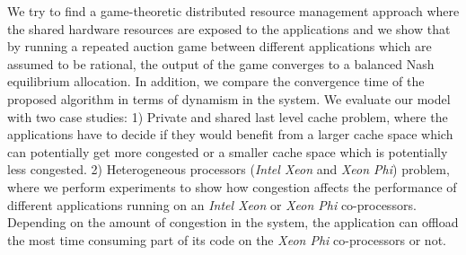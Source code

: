 \indent We try to find a game-theoretic distributed resource management approach where the shared hardware resources are exposed to the applications and we show that by running a repeated auction game between different applications which are assumed to be rational, the output of the game converges to a balanced Nash equilibrium allocation. In addition, we compare the convergence time of the proposed algorithm in terms of dynamism in the system. We evaluate our model with two case studies: 1) Private and shared last level cache problem, where the applications have to decide if they would benefit from a larger cache space which can potentially get more congested or a smaller cache space which is potentially less congested. 2) Heterogeneous processors (\textit{Intel Xeon} and \textit{Xeon Phi}) problem, where we perform experiments to show how congestion affects the performance of different applications running on an \textit{Intel Xeon} or \textit{Xeon Phi} co-processors. Depending on the amount of congestion in the system, the application can offload the most time consuming part of its code on the \textit{Xeon Phi} co-processors or not.
\vspace{-1\baselineskip}
